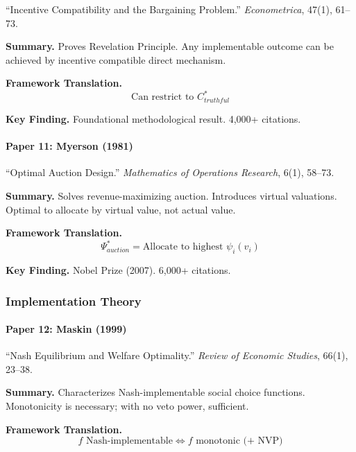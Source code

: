``Incentive Compatibility and the Bargaining Problem.''
\textit{Econometrica}, 47(1), 61--73.

\textbf{Summary.}
Proves Revelation Principle. Any implementable outcome can be achieved 
by incentive compatible direct mechanism.

\textbf{Framework Translation.}
\begin{equation}
\text{Can restrict to } C^*_{truthful}
\end{equation}

\textbf{Key Finding.}
Foundational methodological result. 4,000+ citations.

\paragraph{Paper 11: Myerson (1981)}

``Optimal Auction Design.''
\textit{Mathematics of Operations Research}, 6(1), 58--73.

\textbf{Summary.}
Solves revenue-maximizing auction. Introduces virtual valuations.
Optimal to allocate by virtual value, not actual value.

\textbf{Framework Translation.}
\begin{equation}
\Psi^*_{auction} = \text{Allocate to highest } \psi_i(v_i)
\end{equation}

\textbf{Key Finding.}
Nobel Prize (2007). 6,000+ citations.

\subsubsection{Implementation Theory}

\paragraph{Paper 12: Maskin (1999)}

``Nash Equilibrium and Welfare Optimality.''
\textit{Review of Economic Studies}, 66(1), 23--38.

\textbf{Summary.}
Characterizes Nash-implementable social choice functions.
Monotonicity is necessary; with no veto power, sufficient.

\textbf{Framework Translation.}
\begin{equation}
f \text{ Nash-implementable} \Leftrightarrow f \text{ monotonic (+ NVP)}
\end{equation}

